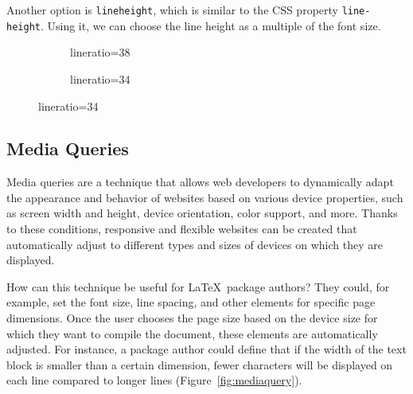 \documentclass{ltxdoc}
\begin{document}
Another option is \verb|lineheight|, which
is similar to the CSS property \verb|line-height|. Using it, we can choose the
line height as a multiple of the font size.




\begin{figure}[htbp]
  \caption{Changing the line spacing by adjusting the value of \texttt{lineratio}.}\label{fig:lineratio}
  \begin{subfigure}[b]{0.45\textwidth}
\caption{lineratio=38}
\end{subfigure}
\begin{subfigure}[b]{0.45\textwidth}
\caption{lineratio=34}
\end{subfigure}
\end{figure}


\subsection{Media Queries}

Media queries are a technique that allows web developers to dynamically adapt
the appearance and behavior of websites based on various device properties,
such as screen width and height, device orientation, color support, and more.
Thanks to these conditions, responsive and flexible websites can be created
that automatically adjust to different types and sizes of devices on which they
are displayed.

How can this technique be useful for \LaTeX\ package authors? They could, for
example, set the font size, line spacing, and other elements for specific page
dimensions. Once the user chooses the page size based on the device size for
which they want to compile the document, these elements are automatically
adjusted. For instance, a package author could define that if the width of the
text block is smaller than a certain dimension, fewer characters will be
displayed on each line compared to longer lines (Figure~\ref{fig:mediaquery}). 
\end{document}
